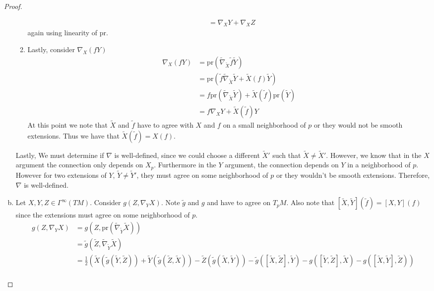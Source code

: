 \documentclass[a4paper]{article}
\begin{document}
\begin{proof}
\begin{enumerate}[(a)]
\begin{enumerate}[1.]
\[\begin{aligned}
                              &= \nabla_X Y + \nabla_X Z
            \end{aligned}
          \]
          again using linearity of $\text{pr}$.
        \item Lastly, consider $\nabla_X (fY)$
          \[
            \begin{aligned}
            \nabla_X (fY) &= \text{pr} \left( \tilde{\nabla}_{\tilde{X}} \tilde{f}\tilde{Y} \right) \\
                          &= \text{pr} \left( \tilde{f} \tilde{\nabla}_{\tilde{X}} \tilde{Y} +  \tilde{X}(f)\tilde{Y}\right)\\
                          &= f\text{pr} \left(\tilde{\nabla}_{\tilde{X}} \tilde{Y}\right) + \tilde{X}(\tilde{f})\text{pr} \left(\tilde{Y}\right) \\
                          &= f \nabla_X Y + \tilde{X}(\tilde{f})Y 
            \end{aligned}
          \]
          At this point we note that $\tilde{X}$ and $\tilde{f}$ have to agree with $X$ and $f$ on a small neighborhood of $p$ or they would not be smooth extensions. Thus we have that $\tilde{X}(\tilde{f}) = X(f)$.
      \end{enumerate}
      Lastly, We must determine if $\nabla$ is well-defined, since we could choose a different $\tilde{X}'$ such that $\tilde{X} \neq \tilde{X}'$. However, we know that in the $X$ argument the connection only depends on $X_p$. Furthermore in the $Y$ argument, the connection depends on $Y$ in a neighborhood of $p$. However for two extensions of $Y$, $\tilde{Y} \neq \tilde{Y}'$, they must agree on some neighborhood of $p$ or they wouldn't be smooth extensions. Therefore, $\nabla$ is well-defined.
    \item Let $X,Y,Z \in \Gamma^{\infty}(TM)$. Consider $g \left(Z, \nabla_Y X\right)$.  Note $\tilde{g}$ and $g$ and have to agree on $T_pM$. Also note that $[\tilde{X}, \tilde{Y}](\tilde{f}) = [X, Y](f)$ since the extensions must agree on some neighborhood of $p$.
      \[
        \begin{aligned}
          g(Z, \nabla_Y X) &=  g\left(Z, \text{pr} \left( \tilde{\nabla}_{\tilde{Y}} \tilde{X} \right)\right) \\
                           &=  \tilde{g} \left(\tilde{Z}, \tilde{\nabla}_{\tilde{Y}} \tilde{X} \right) \\
                           &= \frac{1}{2}\left( \tilde{X}( \tilde{g}( \tilde{Y}, \tilde{Z})) + \tilde{Y}(\tilde{g}(\tilde{Z},\tilde{X})) - \tilde{Z}(\tilde{g}(\tilde{X}, \tilde{Y})) - \tilde{g}([\tilde{X}, \tilde{Z}], \tilde{Y}) - g([\tilde{Y}, \tilde{Z}], \tilde{X}) - g([\tilde{X}, \tilde{Y}], \tilde{Z}) \right) \\

\end{aligned}\]
\end{enumerate}
\end{proof}
\end{document}
